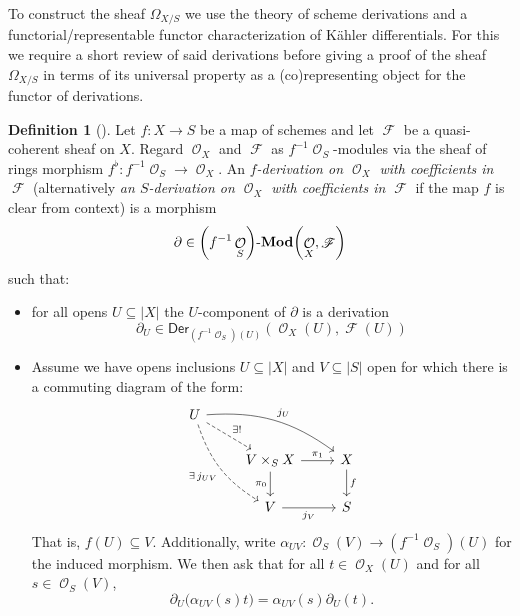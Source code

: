 \documentclass{amsart}
\theoremstyle{definition}
\newtheorem{remark}[equation]{Remark}
\newtheorem{definition}[equation]{Definition}
\DeclareMathOperator{\Fscr}{\mathscr{F}}
\DeclareMathOperator{\Ocal}{\mathcal{O}}
\newcommand{\Mod}[1]{{#1}\textnormal{-}\mathbf{Mod}}
\newcommand{\Kah}[2]{\Omega_{{#1}/{#2}}}
\numberwithin{equation}{subsection}
\begin{document}
To construct the sheaf $\Kah{X}{S}$ we use the theory of scheme derivations and a functorial/representable functor characterization of K{\"a}hler differentials. For this we require a short review of said derivations before giving a proof of the sheaf $\Omega_{X/S}$ in terms of its universal property as a (co)representing object for the functor of derivations.

\begin{definition}[{\cite[Section 16.5.1]{EGA44}}]
Let $f:X \to S$ be a map of schemes and let $\Fscr$ be a quasi-coherent sheaf on $X$. Regard $\Ocal_X$ and $\Fscr$ as $f^{-1}\Ocal_S$-modules via the sheaf of rings morphism $f^{\flat}:f^{-1}\Ocal_S \to \Ocal_X$. An \emph{$f$-derivation on $\Ocal_X$ with coefficients in $\Fscr$} (alternatively \emph{an $S$-derivation on $\Ocal_X$ with coefficients in $\Fscr$} if the map $f$ is clear from context) is a morphism
\[
\partial \in \Mod{\left(f^{-1}\Ocal_S\right)}\!\left(\Ocal_X,\Fscr\right)
\]
such that:
\begin{itemize}
	\item for all opens $U \subseteq \lvert X \rvert$ the $U$-component of $\partial$ is a derivation
	\[
	\partial_U \in \mathsf{Der}_{(f^{-1}\Ocal_S)(U)}\left(\Ocal_X(U),\Fscr(U)\right)
	\]
	\item Assume we have opens inclusions $U \subseteq \lvert X \rvert$ and $V \subseteq \lvert S \rvert$ open for which there is a commuting diagram of the form:
	\[
	\begin{tikzcd}
	U \ar[ddr, swap, bend right = 20, dashed]{}{\exists\,j_{UV}} \ar[drr, bend left = 20]{}{j_U} \ar[dr, dashed]{}{\exists!} \\
	 & V \times_S X \ar[r]{}{\pi_1} \ar[d, swap]{}{\pi_0} & X \ar[d]{}{f} \\
	 & V \ar[r, swap]{}{j_V} & S
	\end{tikzcd}
	\]
	That is,  $f(U) \subseteq V$. Additionally, write $\alpha_{UV}:\Ocal_S(V) \to (f^{-1}\Ocal_S)(U)$ for the induced morphism. We then ask that for all $t \in \Ocal_X(U)$ and for all $s \in \Ocal_S(V)$,
	\[
	\partial_U\big(\alpha_{UV}(s)t\big) = \alpha_{UV}(s)\partial_U(t).
	\]
\end{itemize} 
\end{definition}
%
\end{document}
